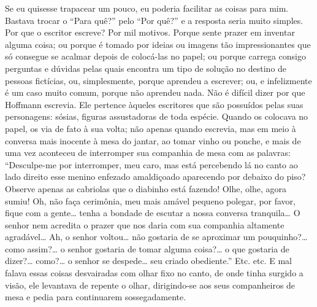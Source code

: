 Se eu quisesse trapacear um pouco, eu poderia facilitar as coisas para
mim. Bastava trocar o ``Para quê?'' pelo ``Por quê?'' e a resposta seria
muito simples. Por que o escritor escreve? Por mil motivos. Porque sente
prazer em inventar alguma coisa; ou porque é tomado por ideias ou
imagens tão impressionantes que só consegue se acalmar depois de
colocá-las no papel; ou porque carrega consigo perguntas e dúvidas pelas
quais encontra um tipo de solução no destino de pessoas fictícias, ou,
simplesmente, porque aprendeu a escrever; ou, e infelizmente é um caso
muito comum, porque não aprendeu nada. Não é difícil dizer por que
Hoffmann escrevia. Ele pertence àqueles escritores que são possuídos
pelas suas personagens: sósias, figuras assustadoras de toda espécie.
Quando os colocava no papel, os via de fato à sua volta; não apenas
quando escrevia, mas em meio à conversa mais inocente à mesa do jantar,
ao tomar vinho ou ponche, e mais de uma vez aconteceu de interromper sua
companhia de mesa com as palavras: ``Desculpe-me por interromper, meu
caro, mas está percebendo lá no canto ao lado direito esse menino
enfezado amaldiçoado aparecendo por debaixo do piso? Observe apenas as
cabriolas que o diabinho está fazendo! Olhe, olhe, agora sumiu! Oh, não
faça cerimônia, meu mais amável pequeno polegar, por favor, fique com a
gente\ldots{} tenha a bondade de escutar a nossa conversa tranquila\ldots{} O
senhor nem acredita o prazer que nos daria com sua companhia altamente
agradável\ldots{} Ah, o senhor voltou\ldots{} não gostaria de se aproximar um
pouquinho?\ldots{} como assim?\ldots{} o senhor gostaria de tomar alguma coisa?\ldots{}
o que gostaria de dizer?\ldots{} como?\ldots{} o senhor se despede\ldots{} seu criado
obediente.'' Etc. etc. E mal falava essas coisas desvairadas com olhar
fixo no canto, de onde tinha surgido a visão, ele levantava de repente o
olhar, dirigindo-se aos seus companheiros de mesa e pedia para
continuarem sossegadamente.

